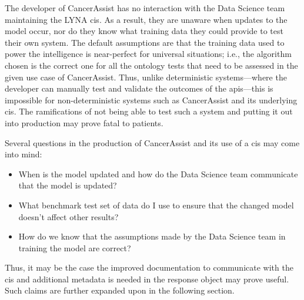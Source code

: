 The developer of CancerAssist has no interaction with the Data Science team maintaining the LYNA \gls{cis}. As a result, they are unaware when updates to the model occur, nor do they know what training data they could provide to test their own system. The default assumptions are that the training data used to power the intelligence is near-perfect for universal situations; i.e., the algorithm chosen is the correct one for all the ontology tests that need to be assessed in the given use case of CancerAssist. Thus, unlike deterministic systems---where the developer can manually test and validate the outcomes of the \glspl{api}---this is impossible for non-deterministic systems such as CancerAssist and its underlying \gls{cis}. The ramifications of not being able to test such a system and putting it out into production may prove fatal to patients.

Several questions in the production of CancerAssist and its use of a \gls{cis} may come into mind:

\begin{itemize}
  \item When is the model updated and how do the Data Science team communicate that the model is updated?
  \item What benchmark test set of data do I use to ensure that the changed model doesn't affect other results?
  \item How do we know that the assumptions made by the Data Science team in training the model are correct?
\end{itemize}

Thus, it may be the case the improved documentation to communicate with the \gls{cis} and additional metadata is needed in the response object may prove useful. Such claims are further expanded upon in the following section.

